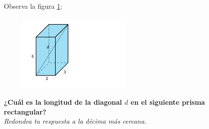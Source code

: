 \question[15]  Observa la figura \ref{fig:pitagoras3D_diag_01}:
\begin{figure}[H]
    \begin{center}
        \includegraphics[width=0.5\textwidth]{../images/pitagoras3D_diag_01.png}
    \end{center}
    \caption{}
    \label{fig:pitagoras3D_diag_01}
\end{figure}
\textbf{¿Cuál es la longitud de la diagonal $d$ en el siguiente prisma rectangular?}\\
\textit{Redondea tu respuesta a la décima más cercana.}